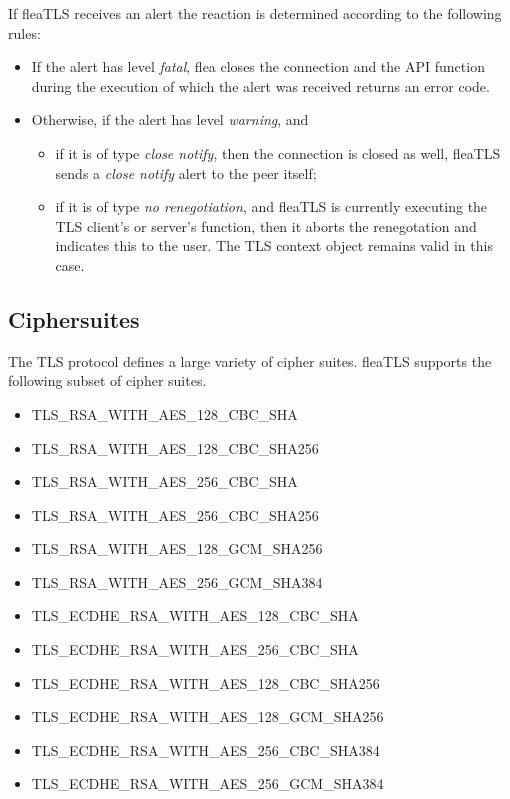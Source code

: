 \documentclass[a4paper,11pt]{scrartcl}
\begin{document}
  If fleaTLS receives an alert the reaction is determined according to the
  following rules:
  \begin{itemize}
    \item If the alert has level \emph{fatal}, flea closes the connection and the API
        function during the execution of which the alert was received returns an
        error code.
      \item Otherwise, if the alert has level \emph{warning}, and
        \begin{itemize}
          \item if it is of type \emph{close notify}, then the connection is closed as
            well, \ie fleaTLS sends a \emph{close notify} alert to the peer itself;
          \item if it is of type \emph{no renegotiation}, and fleaTLS is
            currently executing the TLS client's or server's
             function, then it aborts the renegotation and
            indicates this to the user. The TLS context object remains valid in
            this case.

  \end{itemize}
  \end{itemize}

\subsection{Ciphersuites}

The TLS protocol defines a large variety of cipher suites. fleaTLS
\thisFleaVersion supports the following subset of cipher suites.
\begin{itemize}
  \item TLS\_RSA\_WITH\_AES\_128\_CBC\_SHA
  \item TLS\_RSA\_WITH\_AES\_128\_CBC\_SHA256
  \item TLS\_RSA\_WITH\_AES\_256\_CBC\_SHA
  \item TLS\_RSA\_WITH\_AES\_256\_CBC\_SHA256
  \item TLS\_RSA\_WITH\_AES\_128\_GCM\_SHA256
  \item TLS\_RSA\_WITH\_AES\_256\_GCM\_SHA384
  \item TLS\_ECDHE\_RSA\_WITH\_AES\_128\_CBC\_SHA
  \item TLS\_ECDHE\_RSA\_WITH\_AES\_256\_CBC\_SHA
  \item TLS\_ECDHE\_RSA\_WITH\_AES\_128\_CBC\_SHA256
  \item TLS\_ECDHE\_RSA\_WITH\_AES\_128\_GCM\_SHA256
  \item TLS\_ECDHE\_RSA\_WITH\_AES\_256\_CBC\_SHA384
  \item TLS\_ECDHE\_RSA\_WITH\_AES\_256\_GCM\_SHA384
\end{itemize}
\end{document}
